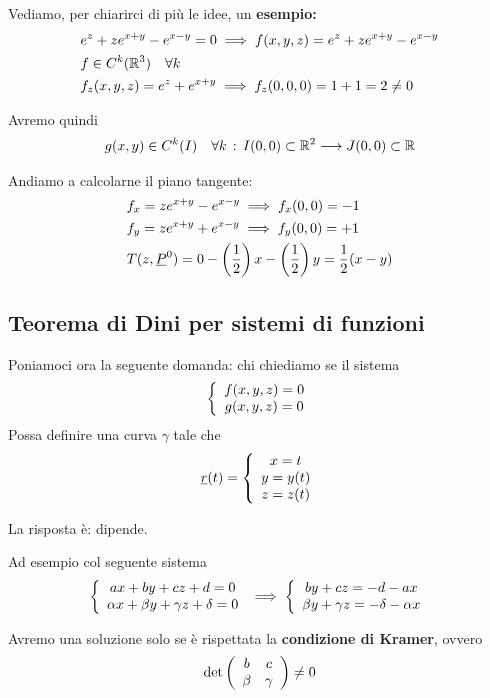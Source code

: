 Vediamo, per chiarirci di più le idee, un \textbf{esempio:}
\begin{align}
	{}&e^{z} + ze^{x+y} - e^{x-y}=0 \implies f(x,y,z)= e^{z} + ze^{x+y} - e^{x-y}\\
	& f\in C^k(\mathbb{R}^3) \quad \forall k\\
	& f_z(x,y,z)= e^{z} + e^{x+y} \implies f_z(0,0,0)= 1+1 = 2 \neq 0
\end{align}

Avremo quindi
\begin{align}
	g(x,y)	\in C^k(I) \quad \forall k \, : \, I(0,0) \subset \mathbb{R}^2 \longrightarrow J(0,0) \subset \mathbb{R} 
\end{align}

Andiamo a calcolarne il piano tangente:
\begin{align}
	{}&f_x= ze^{x+y} - e^{x-y} \implies f_x(0,0) = -1 \\
	&f_y = ze^{x+y} + e^{x-y}\implies f_y(0,0) = +1 \\
	&T(z,\underline{P}^0) = 0 - \left(\frac{1}{2}\right)x - \left(\frac{1}{2}\right)y= \frac{1}{2} (x-y)
\end{align}

\newpage 

\subsection{Teorema di Dini per sistemi di funzioni}

Poniamoci ora la seguente domanda: chi chiediamo se il sistema
\begin{align}
	\left\{\begin{array}{cc} f(x,y,z)=0 \\ g(x,y,z)=0 \end{array}\right.
\end{align}
Possa definire una curva $\gamma$ tale che
\begin{align}
	\underline{r}(t)=\left\{\begin{array}{cc} x=t \\ y=y(t) \\ z=z(t) \end{array}\right.
\end{align}

La risposta è: dipende.

Ad esempio col seguente sistema
\begin{align}
	\left\{\begin{array}{cc} ax + by + cz + d=0 \\ \alpha x + \beta y + \gamma z  + \delta=0 \end{array}\right. \implies \left\{\begin{array}{cc}  by + cz =- d -ax \\ \beta y + \gamma z =  - \delta - \alpha x \end{array}\right.
\end{align}

Avremo una soluzione solo se è rispettata la \textbf{condizione di Kramer}, ovvero
\begin{align}
	\det \left( \begin{array}{ccc} b & c \\ \beta & \gamma \end{array} \right) \neq 0
\end{align}

